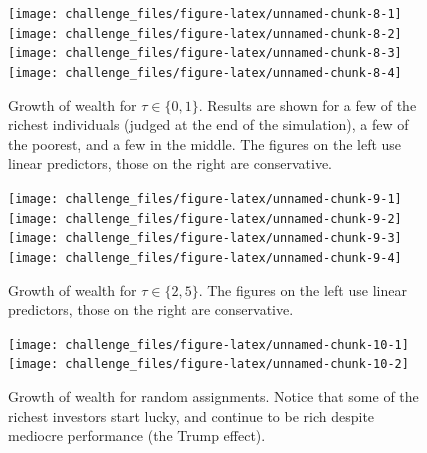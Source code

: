\documentclass[]{article}
\begin{document}
\begin{figure}[p]

{\centering \texttt{[image: challenge\_files/figure-latex/unnamed-chunk-8-1]} \texttt{[image: challenge\_files/figure-latex/unnamed-chunk-8-2]} \texttt{[image: challenge\_files/figure-latex/unnamed-chunk-8-3]} \texttt{[image: challenge\_files/figure-latex/unnamed-chunk-8-4]} 

}

\caption{\label{fig:plot_individual01}Growth of wealth for $\tau \in \{0,1\}$. Results are shown for a few of the richest individuals (judged at the end of the simulation), a few of the poorest, and a few in the middle. The figures on the left use linear predictors, those on the right are conservative.}\label{fig:unnamed-chunk-8}
\end{figure}

\begin{figure}[p]

{\centering \texttt{[image: challenge\_files/figure-latex/unnamed-chunk-9-1]} \texttt{[image: challenge\_files/figure-latex/unnamed-chunk-9-2]} \texttt{[image: challenge\_files/figure-latex/unnamed-chunk-9-3]} \texttt{[image: challenge\_files/figure-latex/unnamed-chunk-9-4]} 

}

\caption{\label{fig:plot_individual25}Growth of wealth for $\tau \in \{2,5\}$. The figures on the left use linear predictors, those on the right are conservative.}\label{fig:unnamed-chunk-9}
\end{figure}

\begin{figure}[p]

{\centering \texttt{[image: challenge\_files/figure-latex/unnamed-chunk-10-1]} \texttt{[image: challenge\_files/figure-latex/unnamed-chunk-10-2]} 

}

\caption{\label{fig:plot_individual_random}Growth of wealth for random assignments. Notice that some of the richest investors start lucky, and continue to be rich despite mediocre performance (the Trump effect).}\label{fig:unnamed-chunk-10}
\end{figure}
\end{document}

